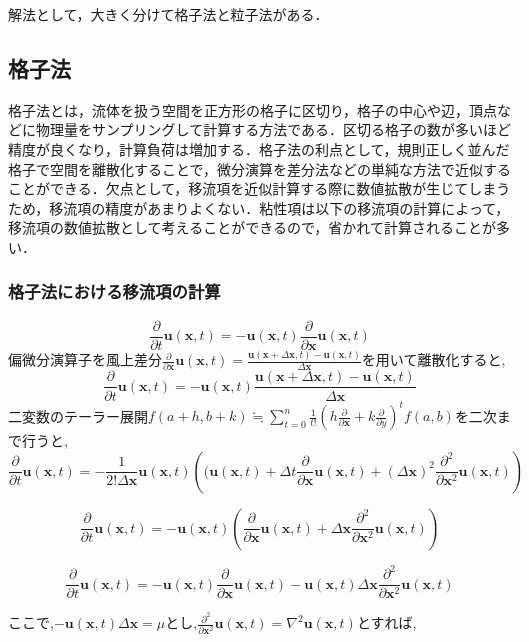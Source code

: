 \documentclass[a4j,12pt]{jreport}
\begin{document}
解法として，大きく分けて格子法と粒子法がある．

\subsection{格子法} \label{subsec:grid}
格子法とは，流体を扱う空間を正方形の格子に区切り，格子の中心や辺，頂点などに物理量をサンプリングして計算する方法である．区切る格子の数が多いほど精度が良くなり，計算負荷は増加する．格子法の利点として，規則正しく並んだ格子で空間を離散化することで，微分演算を差分法などの単純な方法で近似することができる．欠点として，移流項を近似計算する際に数値拡散が生じてしまうため，移流項の精度があまりよくない．粘性項は以下の移流項の計算によって，移流項の数値拡散として考えることができるので，省かれて計算されることが多い．

\subsubsection{格子法における移流項の計算} \label{subsec:gridadvect}
$$\frac{\partial}{\partial t}\bm{u}(\bm{x},t) = -\bm{u}(\bm{x},t)\frac{\partial}{\partial \bm{x}}\bm{u}(\bm{x},t)$$
偏微分演算子を風上差分$\frac{\partial}{\partial \bm{x}}\bm{u}(\bm{x},t) = \frac{\bm{u}(\bm{x}+\Delta \bm{x},t) - \bm{u}(\bm{x},t)}{\Delta \bm{x}}$を用いて離散化すると,
$$\frac{\partial}{\partial t}\bm{u}(\bm{x},t) =  -\bm{u}(\bm{x},t)\frac{\bm{u}(\bm{x}+\Delta \bm{x},t) - \bm{u}(\bm{x},t)}{\Delta \bm{x}}$$
二変数のテーラー展開$f(a+h,b+k) \fallingdotseq \sum\limits_{t=0}^n \frac{1}{t!}(h\frac{\partial}{\partial \bm{x}} + k\frac{\partial}{\partial y})^t f(a,b)$を二次まで行うと,
$$\frac{\partial}{\partial t}\bm{u}(\bm{x},t) = -\frac{1}{2!\Delta \bm{x}}\bm{u}(\bm{x},t)\left( (\bm{u}(\bm{x},t)+\Delta t\frac{\partial}{\partial \bm{x}}\bm{u}(\bm{x},t) + (\Delta \bm{x})^2\frac{\partial^2}{\partial \bm{x}^2}\bm{u}(\bm{x},t) \right)$$
            
$$\frac{\partial}{\partial t}\bm{u}(\bm{x},t) =  -\bm{u}(\bm{x},t)\left(\frac{\partial}{\partial \bm{x}}\bm{u}(\bm{x},t) + \Delta \bm{x}\frac{\partial^2}{\partial \bm{x}^2}\bm{u}(\bm{x},t) \right)$$

$$ \frac{\partial}{\partial t}\bm{u}(\bm{x},t) =  -\bm{u}(\bm{x},t)\frac{\partial}{\partial \bm{x}}\bm{u}(\bm{x},t) -\bm{u}(\bm{x},t)\Delta \bm{x}\frac{\partial^2}{\partial \bm{x}^2}\bm{u}(\bm{x},t)$$

ここで,$ -\bm{u}(\bm{x},t)\Delta \bm{x} = \mu$とし,$\frac{\partial^2}{\partial \bm{x}^2}\bm{u}(\bm{x},t) = \nabla^2\bm{u}(\bm{x},t)$とすれば,
\end{document}
